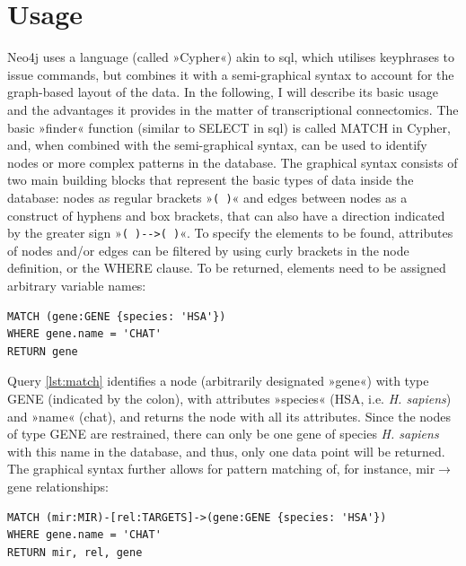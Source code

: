 \section{Usage}
Neo4j uses a language (called »Cypher«) akin to \ac{sql}, which utilises keyphrases to issue commands, but combines it with a semi-graphical syntax to account for the graph-based layout of the data. In the following, I will describe its basic usage and the advantages it provides in the matter of transcriptional connectomics. The basic »finder« function (similar to \textcolor{dkblue}{SELECT} in \ac{sql}) is called \textcolor{dkblue}{MATCH} in Cypher, and, when combined with the semi-graphical syntax, can be used to identify nodes or more complex patterns in the database. The graphical syntax consists of two main building blocks that represent the basic types of data inside the database: nodes as regular brackets »\texttt{( )}« and edges between nodes as  a construct of hyphens and box brackets, that can also have a direction indicated by the greater sign \mbox{»\texttt{( )-\string[ \string]->( )}«}. To specify the elements to be found, attributes of nodes and/or edges can be filtered by using curly brackets in the node definition, or the \textcolor{dkblue}{WHERE} clause. To be returned, elements need to be assigned arbitrary variable names:

\begin{lstlisting}[label=lst:match,caption=MATCH,
language=Cypher]
MATCH (gene:GENE {species: 'HSA'})
WHERE gene.name = 'CHAT'
RETURN gene
\end{lstlisting}

Query \ref{lst:match} identifies a node (arbitrarily designated »gene«) with type GENE (indicated by the colon), with attributes »species« (HSA, i.e. \textit{H. sapiens}) and »name« (\ac{chat}), and returns the node with all its attributes. Since the nodes of type GENE are restrained, there can only be one gene of species \textit{H. sapiens} with this name in the database, and thus, only one data point will be returned. The graphical syntax further allows for pattern matching of, for instance, \ac{mir}$\to$gene relationships:

\begin{lstlisting}[label=lst:pattern,caption=Patterns,
language=Cypher]
MATCH (mir:MIR)-[rel:TARGETS]->(gene:GENE {species: 'HSA'})
WHERE gene.name = 'CHAT'
RETURN mir, rel, gene
\end{lstlisting}

